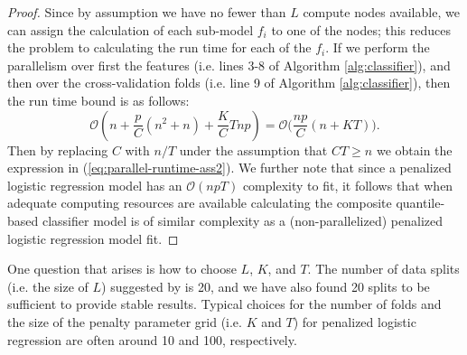 \begin{proof}
  Since by assumption we have no fewer than $L$ compute nodes available, we can
  assign the calculation of each sub-model $f_i$ to one of the nodes; this
  reduces the problem to calculating the run time for each of the $f_i$.  If we
  perform the parallelism over first the features (i.e. lines 3-8 of Algorithm
  \ref{alg:classifier}), and then over the cross-validation folds (i.e. line 9
  of Algorithm \ref{alg:classifier}), then the run time bound is as follows:
  \begin{equation}
    \label{eq:classifier-runtime-parallel}
    \mathcal{O}\left( n + \frac{p}{C} (n^2 + n) + \frac{K}{C} Tnp \right) 
    = \mathcal{O}\Big( \frac{np}{C} (n + KT) \Big).
  \end{equation}
  Then by replacing $C$ with $n/T$ under the assumption that $CT \geq n$ we
  obtain the expression in (\ref{eq:parallel-runtime-ass2}).  We further note
  that since a penalized logistic regression model has an $\mathcal{O}(npT)$
  complexity to fit, it follows that when adequate computing resources are
  available calculating the composite quantile-based classifier model is of
  similar complexity as a (non-parallelized) penalized logistic regression model
  fit.
\end{proof}

One question that arises is how to choose $L$, $K$, and $T$.  The number of data
splits (i.e. the size of $L$) suggested by \cite{fan2016} is 20, and we have
also found 20 splits to be sufficient to provide stable results.  Typical
choices for the number of folds and the size of the penalty parameter grid
(i.e. $K$ and $T$) for penalized logistic regression are often around 10 and
100, respectively.




